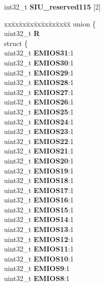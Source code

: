 \begin{DoxyCompactItemize}
\begin{tabbing}
\end{tabbing}\item 
\mbox{\label{structSIU__tag_a9dfc8a8f4f00be0586951b161d232374}} 
int32\+\_\+t {\bfseries S\+I\+U\+\_\+reserved115} \mbox{[}2\mbox{]}
\item 
\mbox{\label{structSIU__tag_a9b6dc37f0cabae613e9bf4ce00ce2c92}} 
\begin{tabbing}
xx\=xx\=xx\=xx\=xx\=xx\=xx\=xx\=xx\=\kill
union \{\\
\>uint32\_t {\bfseries R}\\
\>struct \{\\
\>\>uint32\_t {\bfseries EMIOS31}:1\\
\>\>uint32\_t {\bfseries EMIOS30}:1\\
\>\>uint32\_t {\bfseries EMIOS29}:1\\
\>\>uint32\_t {\bfseries EMIOS28}:1\\
\>\>uint32\_t {\bfseries EMIOS27}:1\\
\>\>uint32\_t {\bfseries EMIOS26}:1\\
\>\>uint32\_t {\bfseries EMIOS25}:1\\
\>\>uint32\_t {\bfseries EMIOS24}:1\\
\>\>uint32\_t {\bfseries EMIOS23}:1\\
\>\>uint32\_t {\bfseries EMIOS22}:1\\
\>\>uint32\_t {\bfseries EMIOS21}:1\\
\>\>uint32\_t {\bfseries EMIOS20}:1\\
\>\>uint32\_t {\bfseries EMIOS19}:1\\
\>\>uint32\_t {\bfseries EMIOS18}:1\\
\>\>uint32\_t {\bfseries EMIOS17}:1\\
\>\>uint32\_t {\bfseries EMIOS16}:1\\
\>\>uint32\_t {\bfseries EMIOS15}:1\\
\>\>uint32\_t {\bfseries EMIOS14}:1\\
\>\>uint32\_t {\bfseries EMIOS13}:1\\
\>\>uint32\_t {\bfseries EMIOS12}:1\\
\>\>uint32\_t {\bfseries EMIOS11}:1\\
\>\>uint32\_t {\bfseries EMIOS10}:1\\
\>\>uint32\_t {\bfseries EMIOS9}:1\\
\>\>uint32\_t {\bfseries EMIOS8}:1\\

\end{tabbing}
\end{DoxyCompactItemize}
